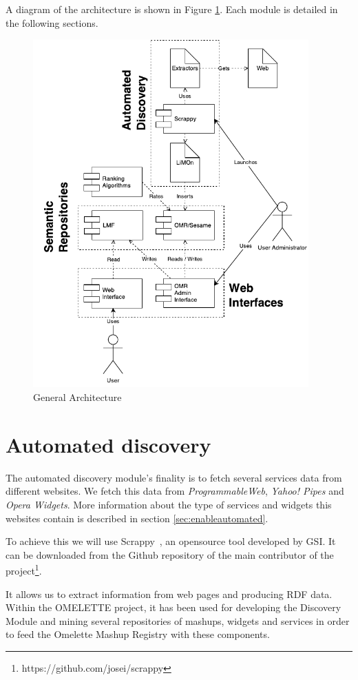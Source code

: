 A diagram of the architecture is shown in Figure \ref{fig:ArchitectureGeneral}. Each module is detailed in the following sections.

\begin{figure}[ht!]
	\centering
	\includegraphics[width=300pt]{graphics/ArchitectureGeneral_v2.pdf}
	\caption{General Architecture}
	\label{fig:ArchitectureGeneral}
\end{figure}

\FloatBarrier

\section{Automated discovery}
\label{sec:scrappy}
The automated discovery module's finality is to fetch several services data from different websites. We fetch this data from \textit{ProgrammableWeb}, \textit{Yahoo! Pipes} and \textit{Opera Widgets}. More information about the type of services and widgets this websites contain is described in section \ref{sec:enableautomated}.

To achieve this we will use Scrappy~\cite{fernandez2011semantic}, an opensource tool  developed by GSI. It can be downloaded from the Github repository of the main contributor of the project\footnote{https://github.com/josei/scrappy}.

It allows us to extract information from web pages and producing RDF data. Within the OMELETTE project, it has been used for developing the Discovery Module and mining several repositories of mashups, widgets and services in order to feed the Omelette Mashup Registry with these components.

